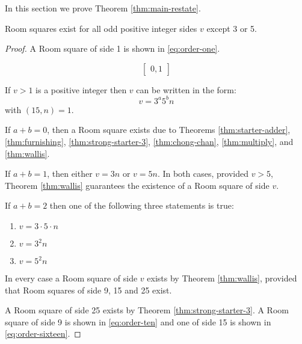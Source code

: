 In this section we prove Theorem \ref{thm:main-restate}.

\begin{theorem}
\label{thm:main-restate}
Room squares exist for all odd positive integer sides $v$ except 3 or 5.
\end{theorem}

\begin{proof}

A Room square of side 1 is shown in \eqref{eq:order-one}.

\begin{equation}
  \begin{bmatrix}
    0, 1 
  \end{bmatrix}
  \label{eq:order-one}
\end{equation}

If $v > 1$ is a positive integer then $v$ can be written in the form:
\begin{equation}
v = 3^{a}5^{b}n
\end{equation}
with $(15, n) = 1$.

If $a + b = 0$, then a Room square exists due to Theorems
\ref{thm:starter-adder},
\ref{thm:furnishing},
\ref{thm:strong-starter-3},
\ref{thm:chong-chan},
\ref{thm:multiply},
and
\ref{thm:wallis}.

If $a + b = 1$, then either $v = 3n$ or $v = 5n$.
In both cases, provided $v > 5$, Theorem \ref{thm:wallis} guarantees the existence of a Room square of side $v$.

If $a + b = 2$ then one of the following three statements is true:
\begin{enumerate}
  \item{$v = 3\cdot 5\cdot n$}
  \item{$v = 3^{2}n$}
  \item{$v = 5^{2}n$}
\end{enumerate}

In every case a Room square of side $v$ exists by Theorem \ref{thm:wallis}, provided that Room squares of side 9, 15 and 25 exist.

A Room square of side 25 exists by Theorem \ref{thm:strong-starter-3}.
A Room square of side 9 is shown in \eqref{eq:order-ten} and one of side 15 is shown in \eqref{eq:order-sixteen}.


\end{proof}
